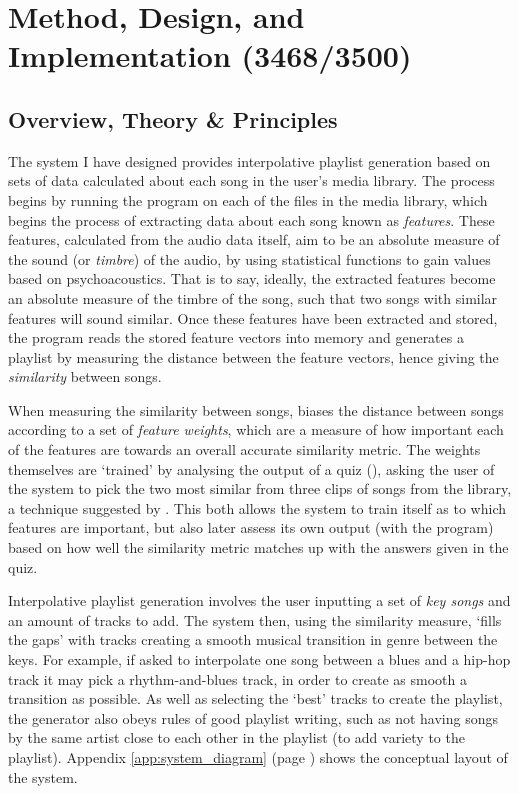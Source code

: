 \chapter{Method, Design, and Implementation (3468/3500)}
\section{Overview, Theory \& Principles}
The system I have designed provides interpolative playlist generation based on sets of data calculated about each song in the user's media library. The process begins by running the  program on each of the files in the media library, which begins the process of extracting data about each song known as \emph{features}. These features, calculated from the audio data itself, aim to be an absolute measure of the sound (or \emph{timbre}) of the audio, by using statistical functions to gain values based on psychoacoustics. That is to say, ideally, the extracted features become an absolute measure of the timbre of the song, such that two songs with similar features will sound similar. Once these features have been extracted and stored, the  program reads the stored feature vectors into memory and generates a playlist by measuring the distance between the feature vectors, hence giving the \emph{similarity} between songs.

When measuring the similarity between songs,  biases the distance between songs according to a set of \emph{feature weights}, which are a measure of how important each of the features are towards an overall accurate similarity metric. The weights themselves are `trained' by analysing the output of a quiz (), asking the user of the system to pick the two most similar from three clips of songs from the library, a technique suggested by \citet*{Novello2006}. This both allows the system to train itself as to which features are important, but also later assess its own output (with the  program) based on how well the similarity metric matches up with the answers given in the quiz.

Interpolative playlist generation involves the user inputting a set of \emph{key songs} and an amount of tracks to add. The system then, using the similarity measure, `fills the gaps' with tracks creating a smooth musical transition in genre between the keys. For example, if asked to interpolate one song between a blues and a hip-hop track it may pick a rhythm-and-blues track, in order to create as smooth a transition as possible. As well as selecting the `best' tracks to create the playlist, the generator also obeys rules of good playlist writing, such as not having songs by the same artist close to each other in the playlist (to add variety to the playlist). Appendix \ref{app:system_diagram} (page \pageref{app:system_diagram}) shows the conceptual layout of the system.

